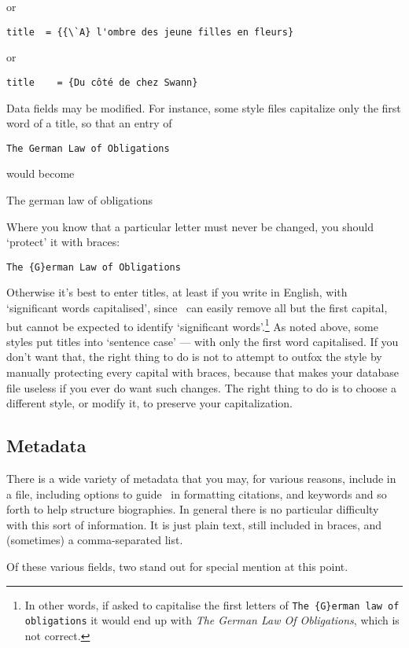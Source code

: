 {\begin{center}
or

\verb|title  = {{\`A} l'ombre des jeune filles en fleurs}|

or

\verb|title    = {Du côté de chez Swann}|
\end{center}

Data fields may be modified. For instance, some style files capitalize only the first word of a title, so that an entry of
\begin{center}
\verb|The German Law of Obligations|
\end{center}
would become
\begin{center}
The german law of obligations
\end{center}
Where you know that a particular letter must never be changed, you should `protect' it with braces:
\begin{center}
\verb|The {G}erman Law of Obligations|
\end{center}
Otherwise it's best to enter titles, at least if you write in English, with `significant words capitalised', since \biblatex\ can easily remove all but the first capital, but cannot be expected to identify `significant words'.\footnote{In other words, if asked to capitalise the first letters of \texttt{The \{G\}erman law of obligations} it would end up with \emph{The German Law Of Obligations}, which is not correct.} As noted above, some styles put titles into `sentence case' --- with only the first word capitalised. If you don't want that, the right thing to do is not to attempt to outfox the style by manually protecting every capital with braces, because that makes your database file useless if you ever do want such changes. The right thing to do is to choose a different style, or modify it, to preserve your capitalization.

\subsection{Metadata}

There is a wide variety of metadata that you may, for various reasons, include in a file, including options to guide \biblatex\ in formatting citations, and keywords and so forth to help structure biographies. In general there is no particular difficulty with this sort of information. It is just plain text, still included in braces, and (sometimes) a comma-separated list.

Of these various fields, two stand out for special mention at this point.

}
